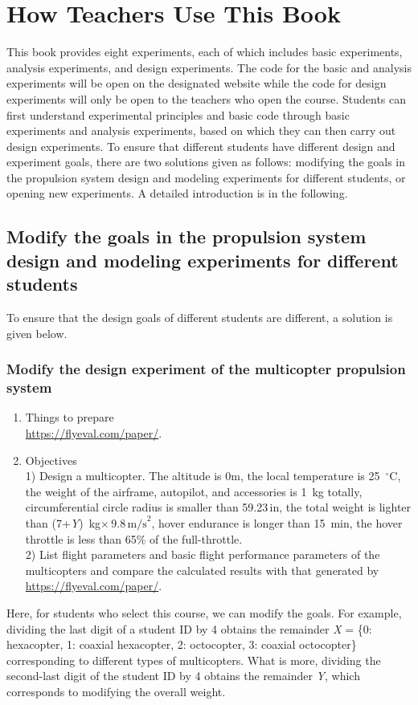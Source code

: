 
\chapter{How Teachers Use This Book}

This book provides eight experiments, each of which includes basic
experiments, analysis experiments, and design experiments. The code
for the basic and analysis experiments will be open on the designated
website while the code for design experiments will only be open to
the teachers who open the course. Students can first understand experimental
principles and basic code through basic experiments and analysis experiments,
based on which they can then carry out design experiments. To ensure
that different students have different design and experiment goals,
there are two solutions given as follows: modifying the goals in the
propulsion system design and modeling experiments for different students,
or opening new experiments. A detailed introduction is in the following.

\section{Modify the goals in the propulsion system design and modeling experiments
for different students}

To ensure that the design goals of different students are different,
a solution is given below.

\subsection{Modify the design experiment of the multicopter propulsion system}
\begin{enumerate}[(1) ]
\item Things to prepare\\
\url{https://flyeval.com/paper/}.
\item Objectives\\
1) Design a multicopter. The altitude is 0m, the local temperature
is 25~$^{\circ}$C, the weight of the airframe, autopilot, and accessories
is 1~kg totally, circumferential circle radius is smaller than 59.23\,in,
the total weight is lighter than (7+\textit{Y})~kg$\times$$\,$9.8$\,\textrm{m/s}^{2}$,
hover endurance is longer than 15~min, the hover throttle is less
than 65\% of the full-throttle. \\
2) List flight parameters and basic flight performance parameters
of the multicopters and compare the calculated results with that generated
by \url{https://flyeval.com/paper/}.
\end{enumerate}
Here, for students who select this course, we can modify the goals.
For example, dividing the last digit of a student ID by 4 obtains
the remainder \textit{X} = \{0: hexacopter, 1: coaxial hexacopter,
2: octocopter, 3: coaxial octocopter\} corresponding to different
types of multicopters. What is more, dividing the second-last digit
of the student ID by 4 obtains the remainder\textit{ Y}, which corresponds
to modifying the overall weight.

